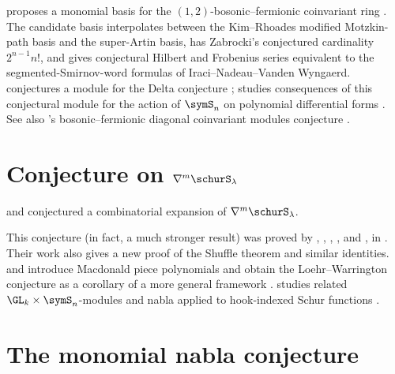  proposes a monomial basis for the
$(1,2)$-bosonic--fermionic coinvariant ring \cite{Lentfer2024x}.  The
candidate basis interpolates between the Kim--Rhoades modified Motzkin-path
basis and the super-Artin basis, has Zabrocki's conjectured cardinality
$2^{n-1}n!$, and gives conjectural Hilbert and Frobenius series equivalent
to the segmented-Smirnov-word formulas of Iraci--Nadeau--Vanden Wyngaerd.
 conjectures a module for the Delta conjecture
\cite{Zabrocki2019x};  studies consequences of this
conjectural module for the action of $\symS_n$ on polynomial differential forms
\cite{Wallach2019x}.  See also 's
bosonic--fermionic diagonal coinvariant modules conjecture
\cite{Bergeron2020BosonicFermionic}.


\section[dhSchur]{Conjecture on $\nabla^m \schurS_\lambda$}

 and  conjectured
a combinatorial expansion of $\nabla^m \schurS_\lambda$.

This conjecture (in fact, a much stronger result)
was proved by , , ,
, and ,
in \cite{BlasiakHaimanMorsePunSeelinger2021xLWConj,BlasiakHaimanMorsePunSeelinger2021xLLT}.
Their work also gives a new proof of the Shuffle theorem and similar
identities.
 and  introduce Macdonald piece
polynomials and obtain the Loehr--Warrington conjecture as a corollary of a
more general framework \cite{KimOh2024x}.
 studies related $\GL_k\times\symS_n$-modules and
nabla applied to hook-indexed Schur functions \cite{Bergeron2019HooksNabla}.


\section[dhMonomial]{The monomial nabla conjecture}



